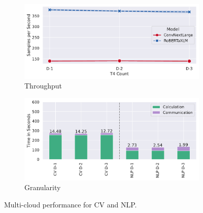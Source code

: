 \begin{figure}
    \begin{subfigure}[c]{0.25\textwidth}
        \includegraphics[width=\textwidth]{figures/misc/multi-cloud-performance}
        \vspace{-15pt}
        \caption{Throughput}
        \label{fig:multi-cloud-throughput}
    \end{subfigure}
    \begin{subfigure}[c]{0.22\textwidth}
        \includegraphics[width=\textwidth]{figures/misc/multi-cloud-performance-granularity}  
        \vspace{-15pt}
        \caption{Granularity}
        \label{fig:multi-cloud-granularity}
    \end{subfigure}
    \vspace{-10pt}
    \caption{Multi-cloud performance for CV and NLP.}
    \label{fig:multi-cloud-performance}
    \vspace*{-5mm}
\end{figure}

